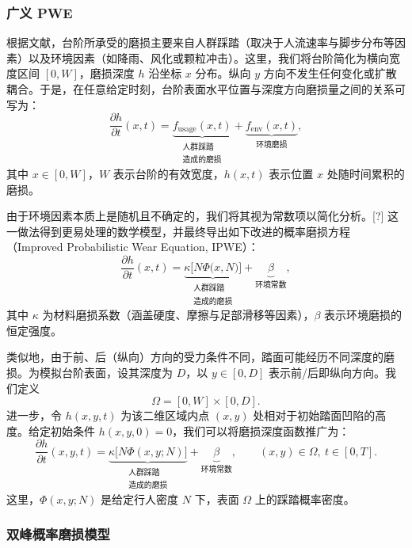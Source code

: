 \documentclass[11pt,a4paper,fontset=windows]{ctexart}
\begin{document}
\subsubsection{广义 PWE}

根据文献，台阶所承受的磨损主要来自人群踩踏（取决于人流速率与脚步分布等因素）以及环境因素（如降雨、风化或颗粒冲击）\cite{4}。这里，我们将台阶简化为横向宽度区间 $[0,W]$，磨损深度 $h$ 沿坐标 $x$ 分布。纵向 $y$ 方向不发生任何变化或扩散耦合。于是，在任意给定时刻，台阶表面水平位置与深度方向磨损量之间的关系可写为：
\begin{equation}
\frac{\partial h}{\partial t}(x,t)=
\underbrace{f_{\text{usage}}(x,t)}_{\substack{\text{人群踩踏}\\[-2pt]\text{造成的磨损}}}
+
\underbrace{f_{\text{env}}(x,t)}_{\text{环境磨损}},
\end{equation}
其中 $x\in[0,W]$，$W$ 表示台阶的有效宽度，$h(x,t)$ 表示位置 $x$ 处随时间累积的磨损。

由于环境因素本质上是随机且不确定的，我们将其视为常数项以简化分析。[?] 这一做法得到更易处理的数学模型，并最终导出如下改进的概率磨损方程（Improved Probabilistic Wear Equation, IPWE）：
\begin{equation}
\frac{\partial h}{\partial t}(x,t)=
\underbrace{\kappa\bigl[N\Phi\bigl(x,N\bigr)\bigr]}_{\substack{\text{人群踩踏}\\[-2pt]\text{造成的磨损}}}
+
\underbrace{\beta}_{\text{环境常数}},
\end{equation}
其中 $\kappa$ 为材料磨损系数（涵盖硬度、摩擦与足部滑移等因素），$\beta$ 表示环境磨损的恒定强度。

类似地，由于前、后（纵向）方向的受力条件不同，踏面可能经历不同深度的磨损。为模拟台阶表面，设其深度为 $D$，以 $y\in[0,D]$ 表示前/后即纵向方向。我们定义
\[
\Omega=[0,W]\times[0,D].
\]
进一步，令 $h(x,y,t)$ 为该二维区域内点 $(x,y)$ 处相对于初始踏面凹陷的高度。给定初始条件 $h(x,y,0)=0$，我们可以将磨损深度函数推广为：
\begin{equation}
\frac{\partial h}{\partial t}(x,y,t)=
\underbrace{\kappa\bigl[N\Phi(x,y;N)\bigr]}_{\substack{\text{人群踩踏}\\[-2pt]\text{造成的磨损}}}
+
\underbrace{\beta}_{\text{环境常数}},
\qquad (x,y)\in\Omega,\ t\in[0,T].
\end{equation}
这里，$\Phi(x,y;N)$ 是给定行人密度 $N$ 下，表面 $\Omega$ 上的踩踏概率密度。

\subsubsection{双峰概率磨损模型}
\end{document}
